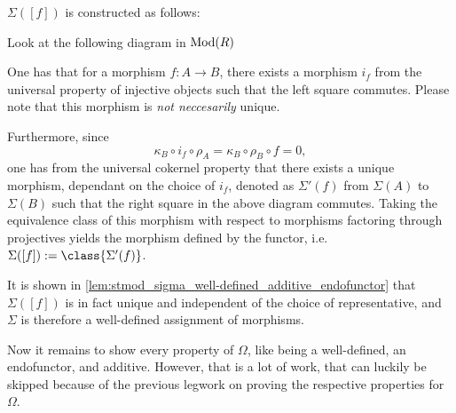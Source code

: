 \begin{remark}
    \label{rem:stmod_sigma_f}
    \( \Sigma([f]) \) is constructed as follows:

    Look at the following diagram in \( \operatorname{Mod}(R) \)
    \begin{center}
    \end{center}

    One has that for a morphism \( f: A \to B \), there exists a morphism \( i_f \) from the universal property of injective objects such that the left square commutes. Please note that this morphism is \emph{not neccesarily} unique.

    Furthermore, since
    \[
        \kappa_B \circ i_f \circ \rho_A = \kappa_B \circ \rho_B \circ f = 0,
    \]
    one has from the universal cokernel property that there exists a unique morphism, dependant on the choice of \( i_f \), denoted as \( \Sigma'(f) \) from \( \Sigma(A) \) to \( \Sigma(B) \) such that the right square in the above diagram commutes. Taking the equivalence class of this morphism with respect to morphisms factoring through projectives yields the morphism defined by the functor, i.e. \( \Sigma([f]) := \class{\Sigma'(f)} \).

    It is shown in \autoref{lem:stmod_sigma_well-defined_additive_endofunctor} that \( \Sigma([f]) \) is in fact unique and independent of the choice of representative, and \( \Sigma \) is therefore a well-defined assignment of morphisms.
\end{remark}

Now it remains to show every property of \( \Omega \), like being a well-defined, an endofunctor, and additive. However, that is a lot of work, that can luckily be skipped because of the previous legwork on proving the respective properties for \( \Omega \).

